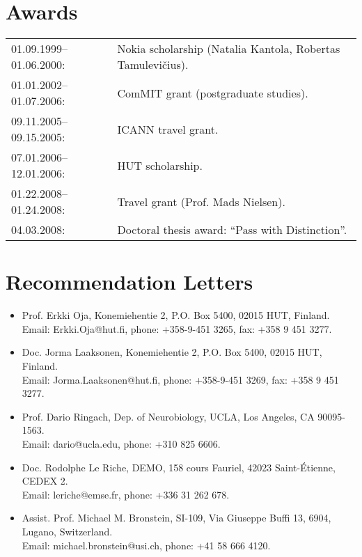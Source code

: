 \documentclass[a4paper,11pt]{article}
\begin{document}
\section{Awards}
%
\begin{tabular}{ll}
        01.09.1999--01.06.2000:& Nokia scholarship (Natalia Kantola, Robertas Tamulevi\v{c}ius).\\
        01.01.2002--01.07.2006:& ComMIT grant (postgraduate studies).\\
        09.11.2005--09.15.2005:& ICANN travel grant.\\
        07.01.2006--12.01.2006:& HUT scholarship.\\
        01.22.2008--01.24.2008:& Travel grant (Prof. Mads Nielsen).\\
        04.03.2008: & Doctoral thesis award: “Pass with Distinction”.
\end{tabular}
%
\section{Recommendation Letters}
%
\begin{itemize}
\item Prof. Erkki Oja, Konemiehentie 2, P.O. Box 5400, 02015 HUT, Finland. \\
Email: Erkki.Oja@hut.fi, phone: +358-9-451 3265, fax: +358 9 451 3277.
\item Doc. Jorma Laaksonen, Konemiehentie 2, P.O. Box 5400, 02015 HUT, Finland. \\
Email: Jorma.Laaksonen@hut.fi, phone: +358-9-451 3269, fax: +358 9 451 3277.
\item Prof. Dario Ringach, Dep. of Neurobiology, UCLA, Los Angeles, CA 90095-1563. \\
Email: dario@ucla.edu, phone: +310 825 6606.
\item Doc. Rodolphe Le Riche, DEMO, 158 cours Fauriel, 42023 Saint-\'Etienne, CEDEX 2.\\ 
Email: leriche@emse.fr, phone: +336 31 262 678.
\item Assist. Prof. Michael M. Bronstein, SI-109, Via Giuseppe Buffi 13, 6904, Lugano, Switzerland.\\
Email: michael.bronstein@usi.ch, phone: +41 58 666 4120.
\end{itemize}
%
\end{document}
